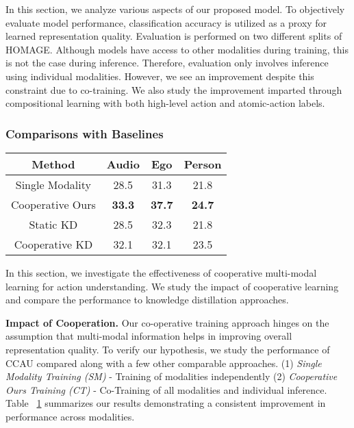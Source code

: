 \documentclass[final]{cvpr}
\begin{document}
In this section, we analyze various aspects of our proposed model. To objectively evaluate model performance, classification accuracy is utilized as a proxy for learned representation quality. Evaluation is performed on two different splits of HOMAGE. Although models have access to other modalities during training, this is not the case during inference. Therefore, evaluation only involves inference using individual modalities. However, we see an improvement despite this constraint due to co-training. We also study the improvement imparted through compositional learning with both high-level action and atomic-action labels.

\vspace{-5pt}
\subsubsection{Comparisons with Baselines}

\begin{table}[t]
\centering
\renewcommand{\arraystretch}{1.0}
\renewcommand{\tabcolsep}{2mm}
\small
\begin{tabular}{c|c|c|c}
    \toprule
    Method & Audio & Ego &  Person \\
    \midrule
    Single Modality    & 28.5 & 31.3 & 21.8 \\
    Cooperative Ours  & \textbf{33.3} & \textbf{37.7} & \textbf{24.7} \\
    \midrule
    Static KD       & 28.5 & 32.3 & 21.8 \\
    Cooperative KD  & 32.1 & 32.1 & 23.5 \\
    \bottomrule
\end{tabular}
\normalsize
\vspace{-5pt}
\vspace{-10pt}
\label{table:baselines}
\end{table}

In this section, we investigate the effectiveness of cooperative multi-modal learning for action understanding. We study the impact of cooperative learning and compare the performance to knowledge distillation approaches.

\noindent\textbf{Impact of Cooperation.} Our co-operative training approach hinges on the assumption that multi-modal information helps in improving overall representation quality. To verify our hypothesis, we study the performance of CCAU compared along with a few other comparable approaches. {(1) \textit{Single Modality Training (SM)}} - Training of modalities independently {(2) \textit{Cooperative Ours Training (CT)}} - Co-Training of all modalities and individual inference. Table ~\ref{table:baselines} summarizes our results demonstrating a consistent improvement in performance across modalities.
\end{document}
